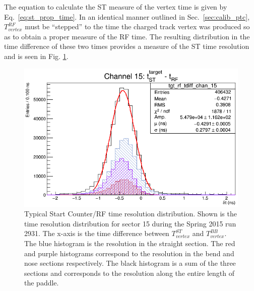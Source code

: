 The equation to calculate the ST measure of the vertex time is given by Eq.~\ref{eq:st_prop_time}.  In an identical manner outlined in Sec.~\ref{sec:calib_ptc}, $T^{RF}_{vertex}$ must be ``stepped'' to the time the charged track vertex was produced so as to obtain a proper measure of the RF time.  The resulting distribution in the time difference of these two times provides a measure of the ST time resolution and is seen in Fig. \ref{fig:beam_tof_corr_chan_15}.
	\begin{figure}[!htb]
		\centering
		\includegraphics[width=0.7\linewidth]{performance/figs/beam_tof_corr_chan_15}
		\caption[Typical Start Counter/RF time resolution distribution]{Typical Start Counter/RF time resolution distribution.  Shown is the time resolution distribution for sector 15 during the Spring 2015 run 2931. The x-axis is the time difference between $T^{ST}_{vertex}$ and $T^{BB}_{vertex}$. The blue histogram is the resolution in the straight section. The red and purple histograms correspond to the resolution in the bend and nose sections respectively. The black histogram is a sum of the three sections and corresponds to the resolution along the entire length of the paddle.}
		\label{fig:beam_tof_corr_chan_15}
	\end{figure}

